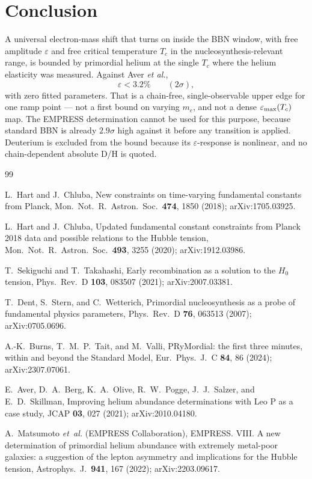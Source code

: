 \documentclass[aps,prd,twocolumn,superscriptaddress,nofootinbib,10pt]{revtex4-2}
\begin{document}
\section{Conclusion}\label{sec:conclude}

A universal electron-mass shift that turns on inside the BBN window, with free amplitude
$\varepsilon$ and free critical temperature $T_c$ in the nucleosynthesis-relevant range, is
bounded by primordial helium at the single $T_c$ where the helium elasticity was measured.
Against Aver \emph{et al.},
%
\begin{equation*}
  \varepsilon < 3.2\% \qquad (2\sigma),
\end{equation*}
%
with zero fitted parameters. That is a chain-free, single-observable upper edge for one ramp
point --- not a first bound on varying $m_e$, and not a dense $\varepsilon_{\rm max}(T_c)$ map.
The EMPRESS determination cannot be used for this purpose, because standard BBN is already
$2.9\sigma$ high against it before any transition is applied. Deuterium is excluded from the
bound because its $\varepsilon$-response is nonlinear, and no chain-dependent absolute D/H is
quoted.

\begin{thebibliography}{99}

L.~Hart and J.~Chluba,
New constraints on time-varying fundamental constants from Planck,
Mon.\ Not.\ R.\ Astron.\ Soc.\ \textbf{474}, 1850 (2018);
arXiv:1705.03925.

L.~Hart and J.~Chluba,
Updated fundamental constant constraints from Planck 2018 data and possible relations to the
Hubble tension,
Mon.\ Not.\ R.\ Astron.\ Soc.\ \textbf{493}, 3255 (2020);
arXiv:1912.03986.

T.~Sekiguchi and T.~Takahashi,
Early recombination as a solution to the $H_0$ tension,
Phys.\ Rev.\ D \textbf{103}, 083507 (2021);
arXiv:2007.03381.

T.~Dent, S.~Stern, and C.~Wetterich,
Primordial nucleosynthesis as a probe of fundamental physics parameters,
Phys.\ Rev.\ D \textbf{76}, 063513 (2007);
arXiv:0705.0696.

A.-K.~Burns, T.~M.~P.~Tait, and M.~Valli,
PRyMordial: the first three minutes, within and beyond the Standard Model,
Eur.\ Phys.\ J.\ C \textbf{84}, 86 (2024);
arXiv:2307.07061.

E.~Aver, D.~A.~Berg, K.~A.~Olive, R.~W.~Pogge, J.~J.~Salzer, and E.~D.~Skillman,
Improving helium abundance determinations with Leo P as a case study,
JCAP \textbf{03}, 027 (2021);
arXiv:2010.04180.

A.~Matsumoto \emph{et~al.} (EMPRESS Collaboration),
EMPRESS. VIII. A new determination of primordial helium abundance with extremely metal-poor
galaxies: a suggestion of the lepton asymmetry and implications for the Hubble tension,
Astrophys.\ J.\ \textbf{941}, 167 (2022);
arXiv:2203.09617.

\end{thebibliography}
\end{document}
